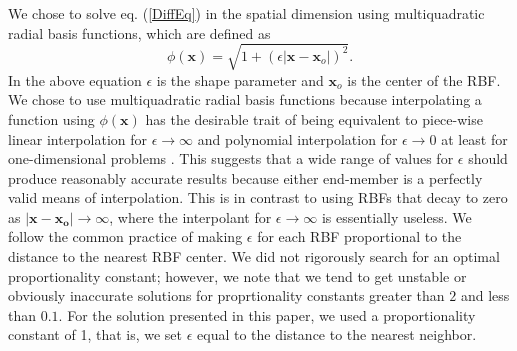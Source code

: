 \documentclass[12pt]{article}
\begin{document}
We chose to solve eq. (\ref{DiffEq}) in the spatial dimension using
multiquadratic radial basis functions, which are defined as
\begin{equation}\label{RBF}
  \phi(\boldsymbol{x}) = \sqrt{1 + (\epsilon|\boldsymbol{x} - \boldsymbol{x}_o|)^2}. 
\end{equation}
In the above equation $\epsilon$ is the shape parameter and
$\boldsymbol{x}_o$ is the center of the RBF.  We chose to use
multiquadratic radial basis functions because interpolating a function
using $\phi(\boldsymbol{x})$ has the desirable trait of being
equivalent to piece-wise linear interpolation for $\epsilon \to
\infty$ and polynomial interpolation for $\epsilon \to 0$ at least for
one-dimensional problems \citep{D2002}.  This suggests that a wide
range of values for $\epsilon$ should produce reasonably accurate
results because either end-member is a perfectly valid means of
interpolation.  This is in contrast to using RBFs that decay to zero
as $|\boldsymbol{x - x_o}| \to \infty$, where the interpolant for $\epsilon
\to \infty$ is essentially useless.  We follow the common practice of
making $\epsilon$ for each RBF proportional to the distance to the
nearest RBF center.  We did not rigorously search for an optimal
proportionality constant; however, we note that we tend to get
unstable or obviously inaccurate solutions for proprtionality
constants greater than $2$ and less than $0.1$.  For the solution
presented in this paper, we used a proportionality constant of 1, that
is, we set $\epsilon$ equal to the distance to the nearest neighbor.
\end{document}
